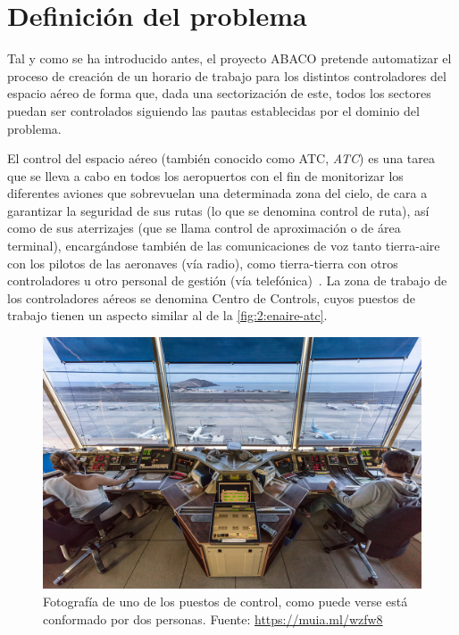 \graphicspath{{capitulos/Capitulo2-Definicion-del-problema/recursos/}}


\section{Definición del problema} \label{apartado:2}

Tal y como se ha introducido antes, el proyecto ABACO pretende automatizar el proceso de creación de un horario de trabajo para los distintos controladores del espacio aéreo de forma que, dada una sectorización de este, todos los sectores puedan ser controlados siguiendo las pautas establecidas por el dominio del problema.

El control del espacio aéreo (también conocido como \gls{ATC}, \textit{\acrlong{ATC}}) es una tarea que se lleva a cabo en todos los aeropuertos con el fin de monitorizar los diferentes aviones que sobrevuelan una determinada zona del cielo, de cara a garantizar la seguridad de sus rutas (lo que se denomina control de ruta), así como de sus aterrizajes (que se llama control de aproximación o de área terminal), encargándose también de las comunicaciones de voz tanto tierra-aire con los pilotos de las aeronaves (vía radio), como tierra-tierra con otros controladores u otro personal de gestión (vía telefónica)~\cite{ENAIRE-web}.
La zona de trabajo de los controladores aéreos se denomina \glspl{Centro de Control}, cuyos puestos de trabajo tienen un aspecto similar al de la \autoref{fig:2:enaire-atc}.

\begin{figure}[htbp]
    \centering
    \includegraphics[width=0.7\linewidth]{ENAIRE-ATC}
    \caption[Fotografía de uno de los puestos de control]{Fotografía de uno de los puestos de control, como puede verse 
    está conformado por dos personas. Fuente: 
    \url{https://muia.ml/wzfw8}}
    \label{fig:2:enaire-atc}
\end{figure}


